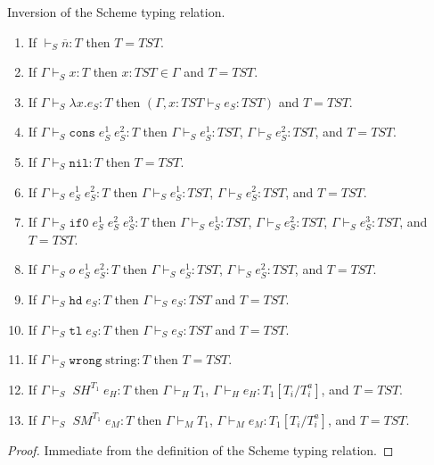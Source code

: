 \begin{sil}
\label{sil}
Inversion of the Scheme typing relation.
\begin{enumerate}
\item If $\vdash_{S}\overline{n}:T$ then $T=TST$.
\item If $\Gamma\vdash_{S}x:T$ then $x:TST\in\Gamma$ and $T=TST$.
\item If $\Gamma\vdash_{S}\lambda x.e_{S}:T$ then $(\Gamma,x:TST\vdash_{S}e_{S}:TST)$ and $T=TST$.
\item If $\Gamma\vdash_{S}\mathtt{cons}\;e_{S}^{1}\;e_{S}^{2}:T$ then $\Gamma\vdash_{S}e_{S}^{1}:TST$, $\Gamma\vdash_{S}e_{S}^{2}:TST$, and $T=TST$.
\item If $\Gamma\vdash_{S}\mathtt{nil}:T$ then $T=TST$.
\item If $\Gamma\vdash_{S}e_{S}^{1}\;e_{S}^{2}:T$ then $\Gamma\vdash_{S}e_{S}^{1}:TST$, $\Gamma\vdash_{S}e_{S}^{2}:TST$, and $T=TST$.
\item If $\Gamma\vdash_{S}\mathtt{if0}\;e_{S}^{1}\;e_{S}^{2}\;e_{S}^{3}:T$ then $\Gamma\vdash_{S}e_{S}^{1}:TST$, $\Gamma\vdash_{S}e_{S}^{2}:TST$, $\Gamma\vdash_{S}e_{S}^{3}:TST$, and $T=TST$.
\item If $\Gamma\vdash_{S}o\;e_{S}^{1}\;e_{S}^{2}:T$ then $\Gamma\vdash_{S}e_{S}^{1}:TST$, $\Gamma\vdash_{S}e_{S}^{2}:TST$, and $T=TST$.
\item If $\Gamma\vdash_{S}\mathtt{hd}\;e_{S}:T$ then $\Gamma\vdash_{S}e_{S}:TST$ and $T=TST$.
\item If $\Gamma\vdash_{S}\mathtt{tl}\;e_{S}:T$ then $\Gamma\vdash_{S}e_{S}:TST$ and $T=TST$.
\item If $\Gamma\vdash_{S}\mathtt{wrong}\;\mathrm{string}:T$ then $T=TST$.
\item If $\Gamma\vdash_{S}\;SH^{T_{1}}\;e_{H}:T$ then $\Gamma\vdash_{H}T_{1}$, $\Gamma\vdash_{H}e_{H}:T_{1}[T_{i}/T_{i}^{a}]$, and $T=TST$.
\item If $\Gamma\vdash_{S}\;SM^{T_{1}}\;e_{M}:T$ then $\Gamma\vdash_{M}T_{1}$, $\Gamma\vdash_{M}e_{M}:T_{1}[T_{i}/T_{i}^{a}]$, and $T=TST$.
\end{enumerate}
\begin{proof}
Immediate from the definition of the Scheme typing relation.
\end{proof}
\end{sil}